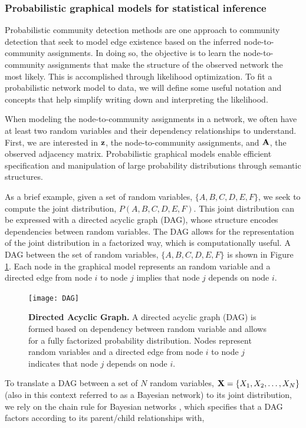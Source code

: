 \subsubsection{Probabilistic graphical models for statistical inference}
\label{pgm}
Probabilistic community detection methods are one approach to community detection that seek to model edge existence based on the inferred node-to-community assignments. In doing so, the objective is to learn the node-to-community assignments that make the structure of the observed network the most likely. This is accomplished through likelihood optimization. To fit a probabilistic network model to data, we will define some useful notation and concepts that help simplify writing down and interpreting the likelihood. 

When modeling the node-to-community assignments in a network, we often have at least two random variables and their dependency relationships to understand. First, we are interested in ${\bf z}$, the node-to-community assignments, and ${\bf A}$, the observed adjacency matrix. Probabilistic graphical models \cite{koller} enable efficient specification and manipulation of large probability distributions through semantic structures.

As a brief example, given a set of random variables, $\{A,B,C,D,E,F\}$, we seek to compute the joint distribution, $P(A,B,C,D,E,F)$. This joint distribution can be expressed with a directed acyclic graph (DAG), whose structure encodes dependencies between random variables. The DAG allows for the representation of the joint distribution in a factorized way, which is computationally useful. A DAG between the set of random variables, $\{A,B,C,D,E,F\}$ is shown in Figure \ref{fig:DAG}. Each node in the graphical model represents an random variable and a directed edge from node $i$ to node $j$ implies that node $j$ depends on node $i$. 

\begin{figure}
\begin{center}
\texttt{[image: DAG]}
\caption{{\bf Directed Acyclic Graph.} A directed acyclic graph (DAG) is formed based on dependency between random variable and allows for a fully factorized probability distribution. Nodes represent random variables and a directed edge from node $i$ to node $j$ indicates that node $j$ depends on node $i$.}
\label{fig:DAG}
\end{center}
\end{figure}

To translate a DAG between a set of $N$ random variables, ${\bf X}=\{X_{1},X_{2},\dots,X_{N}\}$ (also in this context referred to as a Bayesian network) to its joint distribution, we rely on the chain rule for Bayesian networks \cite{koller}, which specifies that a DAG factors according to its parent/child relationships with,

